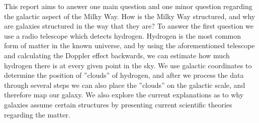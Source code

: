 This report aims to answer one main question and one minor question regarding the galactic aspect of the Milky Way. How is the Milky Way structured, and why are galaxies structured in the way that they are? To answer the first question we use a radio telescope which detects hydrogen. Hydrogen is the most common form of matter in the known universe, and by using the aforementioned telescope and calculating the Doppler effect backwards, we can estimate how much hydrogen there is at every given point in the sky. We use galactic coordinates to determine the position of ''clouds'' of hydrogen, and after we process the data through several steps we can also place the ''clouds'' on the galactic scale, and therefore map our galaxy. We also explore the current explanations as to why galaxies assume certain structures by presenting current scientific theories regarding the matter.